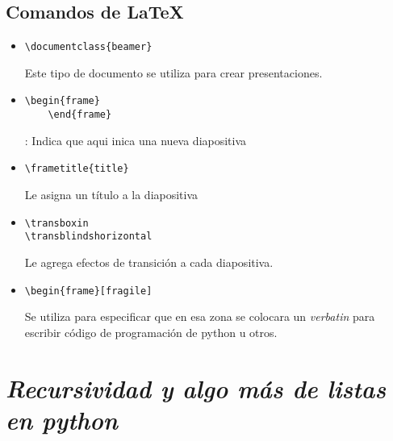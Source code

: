 \documentclass{book}
\begin{document}
	\subsection {Comandos de \LaTeX}
	\begin{itemize}
		\item \begin{lstlisting}
\documentclass{beamer}
		\end{lstlisting} Este tipo de documento se utiliza para crear presentaciones.
		\item \begin{lstlisting}
\begin{frame}
    \end{frame}
		\end{lstlisting} : Indica que aqui inica una nueva diapositiva
		\item \begin{lstlisting}
\frametitle{title}
		\end{lstlisting} Le asigna un título a la diapositiva
		\item \begin{lstlisting}
\transboxin
\transblindshorizontal
		\end{lstlisting} Le agrega efectos de transición a cada diapositiva.
		\item \begin{lstlisting}
\begin{frame}[fragile]
		\end{lstlisting} Se utiliza para especificar que en esa zona se colocara un \textit{verbatin} para escribir código de programación de python u otros.
		
		
		
	\end{itemize}
	



	\section{\textit{Recursividad y algo más de listas en python }}
	
	\begin{flushright}
		\date{23 de enero de 2019}
	\end{flushright}


\end{document}
